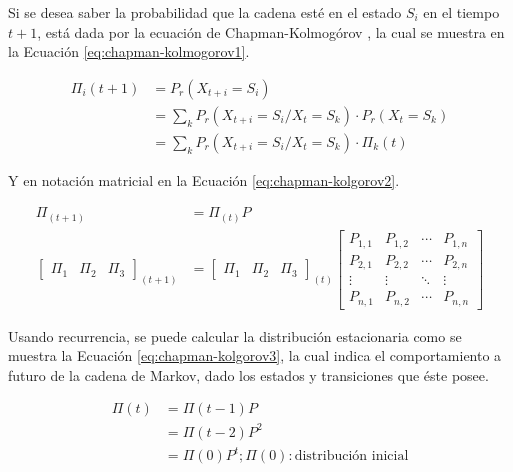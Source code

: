 Si se desea saber la probabilidad que la cadena esté en el estado $S_i$ en el tiempo $t+1$, está dada por la ecuación de Chapman-Kolmogórov \citep{Papoulis1984}, la cual se muestra en la Ecuación \ref{eq:chapman-kolmogorov1}.

\begin{equation} \label{eq:chapman-kolmogorov1}
\begin{split}
	\Pi_{i} (t+1) &= P_r(X_{t+i}=S_i) \\
				  &= \sum _{k} P_r(X_{t+i} = S_i / X_t = S_k)·P_r(X_t = S_k)\\
				  &= \sum _{k} P_r(X_{t+i} = S_i / X_t = S_k)·\Pi_{k} (t)
\end{split}	
\end{equation}

Y en notación matricial en la Ecuación \ref{eq:chapman-kolgorov2}.

\begin{equation} \label{eq:chapman-kolgorov2}
\begin{split}
	\Pi_{(t+1)} &= \Pi_{(t)}P\\
	\begin{bmatrix}
		\Pi_1 & \Pi_2 & \Pi_3
	\end{bmatrix} _{(t+1)}
	&= \begin{bmatrix}
		\Pi_1 & \Pi_2 & \Pi_3
	\end{bmatrix} _{(t)}
	\begin{bmatrix}
		P_{1,1} & P_{1,2} & \cdots & P_{1,n} \\
		P_{2,1} & P_{2,2} & \cdots & P_{2,n} \\
		\vdots  & \vdots  & \ddots & \vdots  \\
		P_{n,1} & P_{n,2} & \cdots & P_{n,n}
	\end{bmatrix}
\end{split}
\end{equation}

Usando recurrencia, se puede calcular la distribución estacionaria como se muestra la Ecuación \ref{eq:chapman-kolgorov3}, la cual indica el comportamiento a futuro de la cadena de Markov, dado los estados y transiciones que éste posee.

\begin{equation} \label{eq:chapman-kolgorov3}
\begin{split}
	\Pi (t) &= \Pi (t-1)P \\
				  &= \Pi (t-2)P^{2}\\
				  &= \Pi (0)P^{t} ; \Pi (0): \text{distribución inicial}
\end{split}
\end{equation}

